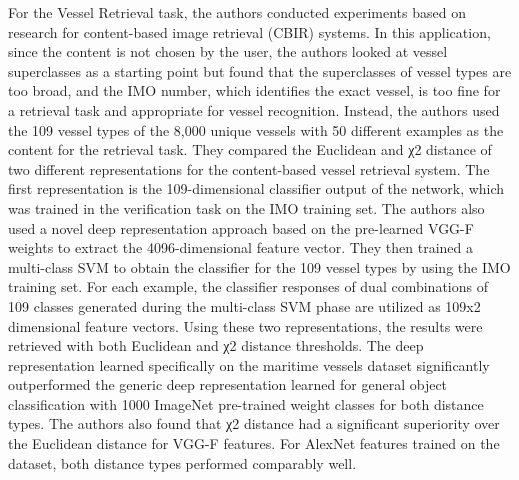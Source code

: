 For the Vessel Retrieval task, the authors conducted experiments based on research for content-based image retrieval (CBIR) systems. In this application, since the content is not chosen by the user, the authors looked at vessel superclasses as a starting point but found that the superclasses of vessel types are too broad, and the IMO number, which identifies the exact vessel, is too fine for a retrieval task and appropriate for vessel recognition. Instead, the authors used the 109 vessel types of the 8,000 unique vessels with 50 different examples as the content for the retrieval task. They compared the Euclidean and χ2 distance of two different representations for the content-based vessel retrieval system. The first representation is the 109-dimensional classifier output of the network, which was trained in the verification task on the IMO training set. The authors also used a novel deep representation approach based on the pre-learned VGG-F weights to extract the 4096-dimensional feature vector. They then trained a multi-class SVM to obtain the classifier for the 109 vessel types by using the IMO training set. For each example, the classifier responses of dual combinations of 109 classes generated during the multi-class SVM phase are utilized as 109x2 dimensional feature vectors. Using these two representations, the results were retrieved with both Euclidean and χ2 distance thresholds. The deep representation learned specifically on the maritime vessels dataset significantly outperformed the generic deep representation learned for general object classification with 1000 ImageNet pre-trained weight classes for both distance types. The authors also found that χ2 distance had a significant superiority over the Euclidean distance for VGG-F features. For AlexNet features trained on the dataset, both distance types performed comparably well.
\\

